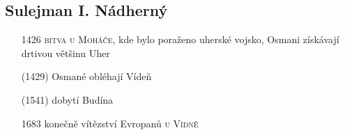 \documentclass{article}
\begin{document}
\subsection*{Sulejman I. Nádherný}
\begin{itemize}
    \vspace{-0.5em}
    \setlength\itemsep{0.15em}
    \item[1426] \textsc{bitva u Moháče}, kde bylo poraženo uherské vojsko, Osmani získávají drtivou většinu Uher
    \item[(1429)] Osmané obléhají Vídeň
    \item[(1541)] dobytí Budína
    \item[1683] konečně vítězství Evropanů \textsc{u Vídně}
\end{itemize}
\end{document}
